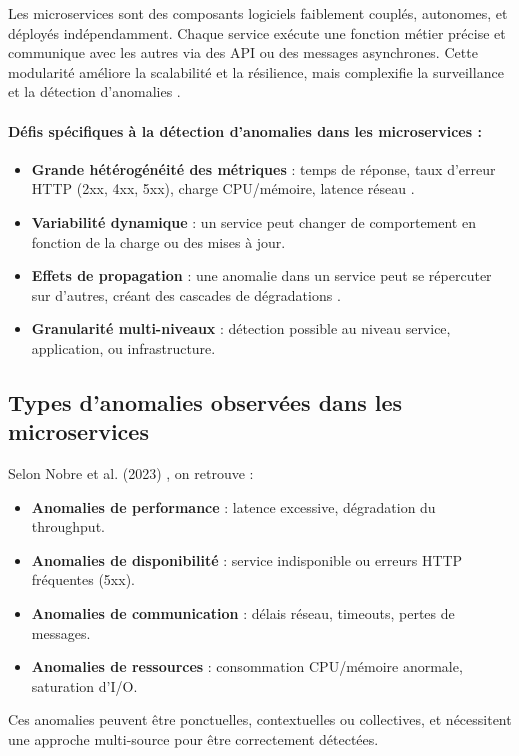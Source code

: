 \documentclass[a4paper,12pt]{report}
\begin{document}
Les microservices sont des composants logiciels faiblement couplés, autonomes, et déployés indépendamment. Chaque service exécute une fonction métier précise et communique avec les autres via des API ou des messages asynchrones. Cette modularité améliore la scalabilité et la résilience, mais complexifie la surveillance et la détection d’anomalies \cite{giamattei2024}.

\paragraph{Défis spécifiques à la détection d’anomalies dans les microservices :}
\begin{itemize}
    \item \textbf{Grande hétérogénéité des métriques} : temps de réponse, taux d’erreur HTTP (2xx, 4xx, 5xx), charge CPU/mémoire, latence réseau \cite{nobre2023}.
    \item \textbf{Variabilité dynamique} : un service peut changer de comportement en fonction de la charge ou des mises à jour.
    \item \textbf{Effets de propagation} : une anomalie dans un service peut se répercuter sur d’autres, créant des cascades de dégradations \cite{chen2020robust}.
    \item \textbf{Granularité multi-niveaux} : détection possible au niveau service, application, ou infrastructure.
\end{itemize}

\subsection{Types d’anomalies observées dans les microservices}

Selon Nobre et al. (2023) \cite{nobre2023}, on retrouve :
\begin{itemize}
    \item \textbf{Anomalies de performance} : latence excessive, dégradation du throughput.
    \item \textbf{Anomalies de disponibilité} : service indisponible ou erreurs HTTP fréquentes (5xx).
    \item \textbf{Anomalies de communication} : délais réseau, timeouts, pertes de messages.
    \item \textbf{Anomalies de ressources} : consommation CPU/mémoire anormale, saturation d’I/O.
\end{itemize}

Ces anomalies peuvent être ponctuelles, contextuelles ou collectives, et nécessitent une approche multi-source pour être correctement détectées.
\end{document}
